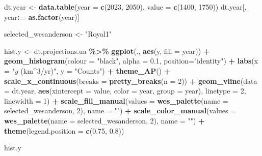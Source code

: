 \documentclass[
  11pt,
]{article}
\newenvironment{Shaded}{\begin{snugshade}}{\end{snugshade}}
\newcommand{\AttributeTok}[1]{\textcolor[rgb]{0.13,0.29,0.53}{#1}}
\newcommand{\DecValTok}[1]{\textcolor[rgb]{0.00,0.00,0.81}{#1}}
\newcommand{\FloatTok}[1]{\textcolor[rgb]{0.00,0.00,0.81}{#1}}
\newcommand{\FunctionTok}[1]{\textcolor[rgb]{0.13,0.29,0.53}{\textbf{#1}}}
\newcommand{\NormalTok}[1]{#1}
\newcommand{\OtherTok}[1]{\textcolor[rgb]{0.56,0.35,0.01}{#1}}
\newcommand{\SpecialCharTok}[1]{\textcolor[rgb]{0.81,0.36,0.00}{\textbf{#1}}}
\newcommand{\StringTok}[1]{\textcolor[rgb]{0.31,0.60,0.02}{#1}}
\begin{document}
\begin{Shaded}
\begin{Highlighting}[]
\NormalTok{dt.year }\OtherTok{\textless{}{-}} \FunctionTok{data.table}\NormalTok{(}\AttributeTok{year =} \FunctionTok{c}\NormalTok{(}\DecValTok{2023}\NormalTok{, }\DecValTok{2050}\NormalTok{), }\AttributeTok{value =} \FunctionTok{c}\NormalTok{(}\DecValTok{1400}\NormalTok{, }\DecValTok{1750}\NormalTok{))}
\NormalTok{dt.year[, year}\SpecialCharTok{:=} \FunctionTok{as.factor}\NormalTok{(year)]}

\NormalTok{selected\_wesanderson }\OtherTok{\textless{}{-}} \StringTok{"Royal1"}

\NormalTok{hist.y }\OtherTok{\textless{}{-}}\NormalTok{ dt.projections.ua }\SpecialCharTok{\%\textgreater{}\%}
  \FunctionTok{ggplot}\NormalTok{(., }\FunctionTok{aes}\NormalTok{(y, }\AttributeTok{fill =}\NormalTok{ year)) }\SpecialCharTok{+}
  \FunctionTok{geom\_histogram}\NormalTok{(}\AttributeTok{colour =} \StringTok{"black"}\NormalTok{, }\AttributeTok{alpha =} \FloatTok{0.1}\NormalTok{, }\AttributeTok{position=}\StringTok{"identity"}\NormalTok{) }\SpecialCharTok{+}
  \FunctionTok{labs}\NormalTok{(}\AttributeTok{x =} \StringTok{"$y$ (km$\^{}3$/yr)"}\NormalTok{, }\AttributeTok{y =} \StringTok{"Counts"}\NormalTok{) }\SpecialCharTok{+}
  \FunctionTok{theme\_AP}\NormalTok{() }\SpecialCharTok{+}
  \FunctionTok{scale\_x\_continuous}\NormalTok{(}\AttributeTok{breaks =} \FunctionTok{pretty\_breaks}\NormalTok{(}\AttributeTok{n =} \DecValTok{2}\NormalTok{)) }\SpecialCharTok{+}
  \FunctionTok{geom\_vline}\NormalTok{(}\AttributeTok{data =}\NormalTok{ dt.year, }\FunctionTok{aes}\NormalTok{(}\AttributeTok{xintercept =}\NormalTok{ value, }\AttributeTok{color =}\NormalTok{ year, }\AttributeTok{group =}\NormalTok{ year), }
             \AttributeTok{linetype =} \DecValTok{2}\NormalTok{, }\AttributeTok{linewidth =} \DecValTok{1}\NormalTok{) }\SpecialCharTok{+}
  \FunctionTok{scale\_fill\_manual}\NormalTok{(}\AttributeTok{values =} \FunctionTok{wes\_palette}\NormalTok{(}\AttributeTok{name =}\NormalTok{ selected\_wesanderson, }\DecValTok{2}\NormalTok{),}
                    \AttributeTok{name =} \StringTok{""}\NormalTok{) }\SpecialCharTok{+}
  \FunctionTok{scale\_color\_manual}\NormalTok{(}\AttributeTok{values =} \FunctionTok{wes\_palette}\NormalTok{(}\AttributeTok{name =}\NormalTok{ selected\_wesanderson, }\DecValTok{2}\NormalTok{),}
                    \AttributeTok{name =} \StringTok{""}\NormalTok{) }\SpecialCharTok{+}
  \FunctionTok{theme}\NormalTok{(}\AttributeTok{legend.position =} \FunctionTok{c}\NormalTok{(}\FloatTok{0.75}\NormalTok{, }\FloatTok{0.8}\NormalTok{))}

\NormalTok{hist.y}
\end{Highlighting}
\end{Shaded}
\end{document}
